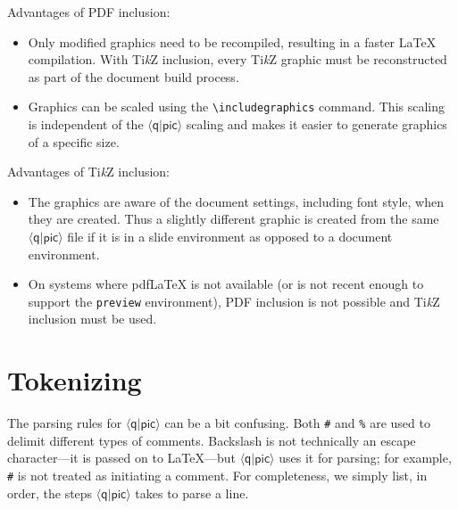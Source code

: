 \documentclass[twoside,12pt]{article}
\newcommand{\qpic}{$\langle\mathsf{q}|\mathsf{pic}\rangle$\xspace}
\newcommand{\TikZ}{Ti\emph{k}Z\xspace}
\begin{document}
Advantages of PDF inclusion:
\begin{itemize}
\item Only modified graphics need to be recompiled, resulting in a faster {\LaTeX} compilation. With \TikZ inclusion, every \TikZ graphic must be reconstructed as part of the document build process.
\item Graphics can be scaled using the \verb|\includegraphics| command. This scaling is independent of the \qpic scaling and makes it easier to generate graphics of a specific size.
\end{itemize}


Advantages of \TikZ inclusion:
\begin{itemize}
\item The graphics are aware of the document settings, including font style, when they are created. Thus a slightly different graphic is created from the same \qpic file if it is in a slide environment as opposed to a document environment.
\item On systems where pdf{\LaTeX} is not available (or is not recent enough to support the \verb|preview| environment), PDF inclusion is not possible and \TikZ inclusion must be used.
\end{itemize}


\appendix
\section{Tokenizing}
\label{sec-tokens}

The parsing rules for \qpic can be a bit confusing.  Both {\tt \#} and {\tt \%} are used to delimit different
types of comments.  Backslash is not technically an escape character---it is passed on to \LaTeX---but \qpic
uses it for parsing; for example, {\tt {}\#} is not treated as initiating a comment.  For completeness,
we simply list, in order, the steps \qpic takes to parse a line.
\end{document}
